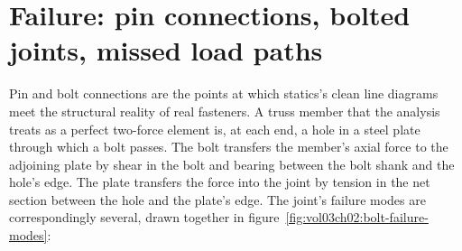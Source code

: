

\section{Failure: pin connections, bolted joints, missed load paths}

Pin and bolt connections are the points at which statics's
clean line diagrams meet the structural reality of real fasteners.
A truss member that the analysis treats as a perfect two-force
element is, at each end, a hole in a steel plate through which a
bolt passes. The bolt transfers the member's axial force to the
adjoining plate by shear in the bolt and bearing between the bolt
shank and the hole's edge. The plate transfers the force into the
joint by tension in the net section between the hole and the
plate's edge. The joint's failure modes are correspondingly several,
drawn together in figure~\ref{fig:vol03ch02:bolt-failure-modes}:

